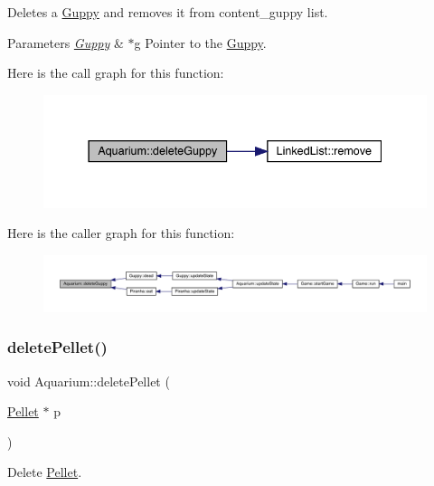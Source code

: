 Deletes a \mbox{\hyperlink{class_guppy}{Guppy}} and removes it from content\+\_\+guppy list. 
\begin{DoxyParams}{Parameters}
{\em \mbox{\hyperlink{class_guppy}{Guppy}}} & $\ast$g Pointer to the \mbox{\hyperlink{class_guppy}{Guppy}}. \\
\hline
\end{DoxyParams}
Here is the call graph for this function\+:\nopagebreak
\begin{figure}[H]
\begin{center}
\leavevmode
\includegraphics[width=337pt]{class_aquarium_ae2372aef40d9474573833262b6062eb2_cgraph}
\end{center}
\end{figure}
Here is the caller graph for this function\+:\nopagebreak
\begin{figure}[H]
\begin{center}
\leavevmode
\includegraphics[width=350pt]{class_aquarium_ae2372aef40d9474573833262b6062eb2_icgraph}
\end{center}
\end{figure}
\mbox{\label{class_aquarium_a61329fb56bcb5af2e06fc62568456f1b}} 
\subsubsection{\texorpdfstring{delete\+Pellet()}{deletePellet()}}
{\footnotesize\ttfamily void Aquarium\+::delete\+Pellet (\begin{DoxyParamCaption}\item[{\mbox{\hyperlink{class_pellet}{Pellet}} $\ast$}]{p }\end{DoxyParamCaption})}



Delete \mbox{\hyperlink{class_pellet}{Pellet}}. 

